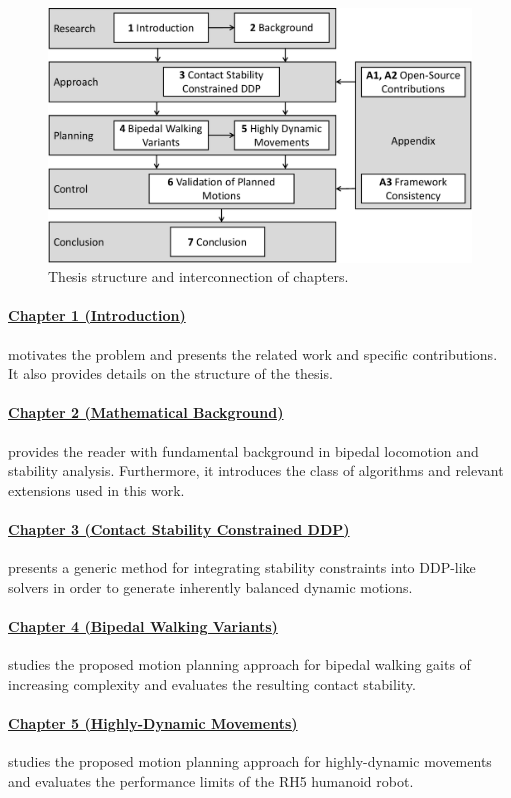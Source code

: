 \begin{figure}
\centering	
\includegraphics[width=.8\textwidth]{img/structure3}
\caption[Thesis structure and interconnection of chapters]{Thesis structure and interconnection of chapters.}
\label{img:structure}
\end{figure}

\paragraph{\hyperref[c1]{Chapter 1 (Introduction)}} motivates the problem and presents the related work and specific contributions. It also provides details on the structure of the thesis.
\paragraph{\hyperref[c2]{Chapter 2 (Mathematical Background)}} provides the reader with fundamental background in bipedal locomotion and stability analysis. Furthermore, it introduces the class of algorithms and relevant extensions used in this work.
\paragraph{\hyperref[c3]{Chapter 3 (Contact Stability Constrained DDP)}} presents a generic method for integrating stability constraints into DDP-like solvers in order to generate inherently balanced dynamic motions.
\paragraph{\hyperref[c4]{Chapter 4 (Bipedal Walking Variants)}} studies the proposed motion planning approach for bipedal walking gaits of increasing complexity and evaluates the resulting contact stability. 
\paragraph{\hyperref[c5]{Chapter 5 (Highly-Dynamic Movements)}} studies the proposed motion planning approach for highly-dynamic movements and evaluates the performance limits of the RH5 humanoid robot.
